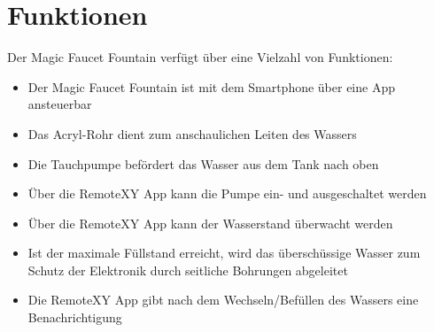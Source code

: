 %
%

\chapter{Funktionen}
Der Magic Faucet Fountain verfügt über eine Vielzahl von Funktionen:
\begin{itemize}
	\item Der Magic Faucet Fountain ist mit dem Smartphone über eine App ansteuerbar
	\item Das Acryl-Rohr dient zum anschaulichen Leiten des Wassers
	\item Die Tauchpumpe befördert das Wasser aus dem Tank nach oben
	\item Über die RemoteXY App kann die Pumpe ein- und ausgeschaltet werden 
	\item Über die RemoteXY App kann der Wasserstand überwacht werden 
	\item Ist der maximale Füllstand erreicht, wird das überschüssige Wasser zum Schutz der Elektronik durch seitliche Bohrungen abgeleitet
	\item Die RemoteXY App gibt nach dem Wechseln/Befüllen des Wassers eine Benachrichtigung
\end{itemize}

